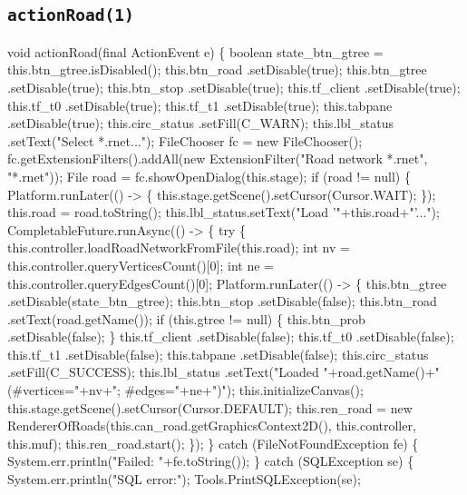 \subsection{\texttt{actionRoad(1)}}
\nwenddocs{}\endmoddef{}
void actionRoad(final ActionEvent e) \{
  boolean state_btn_gtree = this.btn_gtree.isDisabled();
  this.btn_road     .setDisable(true);
  this.btn_gtree    .setDisable(true);
  this.btn_stop     .setDisable(true);
  this.tf_client    .setDisable(true);
  this.tf_t0        .setDisable(true);
  this.tf_t1        .setDisable(true);
  this.tabpane      .setDisable(true);
  this.circ_status  .setFill(C_WARN);
  this.lbl_status   .setText("Select *.rnet...");
  FileChooser fc = new FileChooser();
  fc.getExtensionFilters().addAll(new ExtensionFilter("Road network *.rnet", "*.rnet"));
  File road = fc.showOpenDialog(this.stage);
  if (road != null) \{
    Platform.runLater(() -> \{
      this.stage.getScene().setCursor(Cursor.WAIT);
    \});
    this.road = road.toString();
    this.lbl_status.setText("Load '"+this.road+"'...");
    CompletableFuture.runAsync(() -> \{
      try \{
        this.controller.loadRoadNetworkFromFile(this.road);
        int nv = this.controller.queryVerticesCount()[0];
        int ne = this.controller.queryEdgesCount()[0];
        Platform.runLater(() -> \{
          this.btn_gtree    .setDisable(state_btn_gtree);
          this.btn_stop     .setDisable(false);
          this.btn_road     .setText(road.getName());
          if (this.gtree != null) \{
            this.btn_prob   .setDisable(false);
          \}
          this.tf_client    .setDisable(false);
          this.tf_t0        .setDisable(false);
          this.tf_t1        .setDisable(false);
          this.tabpane      .setDisable(false);
          this.circ_status  .setFill(C_SUCCESS);
          this.lbl_status   .setText("Loaded "+road.getName()+" (#vertices="+nv+"; #edges="+ne+")");
          this.initializeCanvas();
          this.stage.getScene().setCursor(Cursor.DEFAULT);
          this.ren_road = new RendererOfRoads(this.can_road.getGraphicsContext2D(), this.controller, this.muf);
          this.ren_road.start();
        \});
      \} catch (FileNotFoundException fe) \{
        System.err.println("Failed: "+fe.toString());
      \} catch (SQLException se) \{
        System.err.println("SQL error:");
        Tools.PrintSQLException(se);
